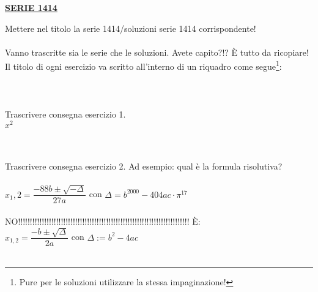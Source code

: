 \documentclass[a4paper,10pt]{article}
\begin{document}
\pagestyle{empty}


\begin{center}
\LARGE{\bf \underline{SERIE 1414}}\\[1mm]
\end{center}
Mettere nel titolo la serie 1414/soluzioni serie 1414 corrispondente!\\\\

Vanno trascritte sia le serie che le soluzioni. Avete capito?!? 
\`E tutto da ricopiare!\\
Il titolo di ogni esercizio va scritto all'interno di un riquadro come segue\footnote{Pure per le soluzioni utilizzare la stessa impaginazione!}:\\\\

\\\\
Trascrivere consegna esercizio 1.\\
$x^2$

\vspace*{1cm}
\\\\
Trascrivere consegna esercizio 2. Ad esempio: qual \`e la formula risolutiva?\\\\
$x_1,2=\dfrac{-88b\pm\sqrt{-\Delta}}{27a}$ con $\Delta=b^{2000}-404ac\cdot\pi^{17}$\\\\
NO!!!!!!!!!!!!!!!!!!!!!!!!!!!!!!!!!!!!!!!!!!!!!!!!!!!!!!!!!!!!!!!!!!!!!!!! \`E:\\

$x_{1,2}=\dfrac{-b\pm\sqrt{\Delta}}{2a}$ con $\Delta:=b^2-4ac$\\\\
\end{document}
